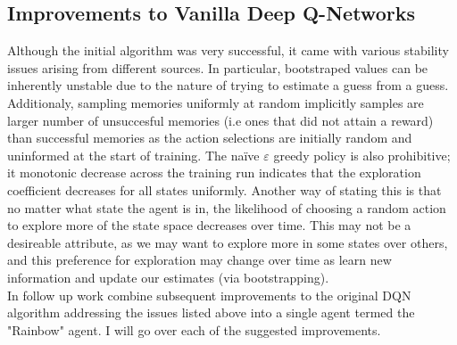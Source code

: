\subsection{Improvements to Vanilla Deep Q-Networks}
Although the initial algorithm was very successful, it came with various stability 
issues arising from different sources. In particular, bootstraped values can be inherently
unstable \cite{sutton2018reinforcement} due to the nature of trying to estimate a guess from
a guess. Additionaly, sampling memories uniformly at random implicitly samples
are larger number of unsuccesful memories (i.e ones that did not attain a reward) than successful
memories as the action selections are initially random and uninformed at the start of training.
The na\"{i}ve $\varepsilon$ greedy policy is also prohibitive; it monotonic decrease across
the training run indicates that the exploration coefficient decreases for all states uniformly.
Another way of stating this is that no matter what state the agent is in, the likelihood
of choosing a random action to explore more of the state space decreases over time.
This may not be a desireable attribute, as we may want to explore more in some states over others,
and this preference for exploration may change over time as learn new information and update
our estimates (via bootstrapping). \\
In follow up work \cite{Hessel2017} combine subsequent improvements to the original DQN algorithm
addressing the issues listed above into a single agent termed the "Rainbow" agent. I will
go over each of the suggested improvements.
